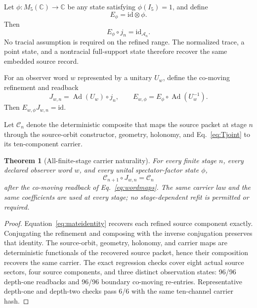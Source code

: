 \documentclass[11pt]{article}
\newtheorem{theorem}{Theorem}[section]
\theoremstyle{definition}
\theoremstyle{remark}
\newcommand{\cA}{\mathcal{A}}
\newcommand{\cC}{\mathcal{C}}
\newcommand{\Ad}{\operatorname{Ad}}
\begin{document}
Let $\phi:M_5(\mathbb C)\to\mathbb C$ be any state satisfying $\phi(I_5)=1$, and define
\begin{equation}\label{eq:obsmate}
 E_\phi=\mathrm{id}\otimes\phi.
\end{equation}
Then
\begin{equation}\label{eq:mateidentity}
 E_\phi\circ j_n=\mathrm{id}_{\cA_n}.
\end{equation}
No tracial assumption is required on the refined range. The normalized trace, a point state, and a nontracial full-support state therefore recover the same embedded source record.

For an observer word $w$ represented by a unitary $U_w$, define the co-moving refinement and readback
\begin{equation}\label{eq:wordmaps}
 J_{w,n}=\Ad(U_w)\circ j_n,
 \qquad
 E_{w,\phi}=E_\phi\circ\Ad(U_w^{-1}).
\end{equation}
Then $E_{w,\phi}J_{w,n}=\mathrm{id}$.

Let $\cC_n$ denote the deterministic composite that maps the source packet at stage $n$ through the source-orbit constructor, geometry, holonomy, and Eq.~\eqref{eq:Tjoint} to its ten-component carrier.

\begin{theorem}[All-finite-stage carrier naturality]\label{thm:x61}
For every finite stage $n$, every declared observer word $w$, and every unital spectator-factor state $\phi$,
\begin{equation}\label{eq:naturality}
 \cC_{n+1}\circ J_{w,n}=\cC_n
\end{equation}
after the co-moving readback of Eq.~\eqref{eq:wordmaps}. The same carrier law and the same coefficients are used at every stage; no stage-dependent refit is permitted or required.
\end{theorem}

\begin{proof}
Equation~\eqref{eq:mateidentity} recovers each refined source component exactly. Conjugating the refinement and composing with the inverse conjugation preserves that identity. The source-orbit, geometry, holonomy, and carrier maps are deterministic functionals of the recovered source packet, hence their composition recovers the same carrier. The exact regression checks cover eight actual source sectors, four source components, and three distinct observation states: 96/96 depth-one readbacks and 96/96 boundary co-moving re-entries. Representative depth-one and depth-two checks pass 6/6 with the same ten-channel carrier hash.
\end{proof}
\end{document}
